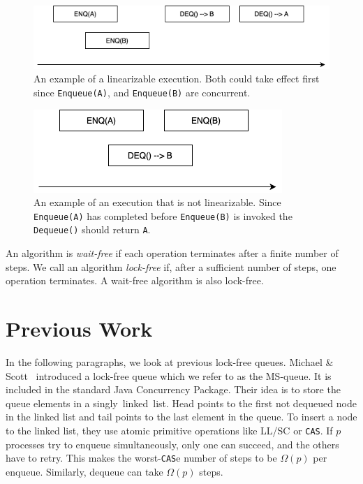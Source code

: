 \documentclass[12pt]{article}
\begin{document}
\begin{figure}[hbt]
  \center\includegraphics[scale=0.5]{pics/good}
  \caption{\label{fig::goodexample}An example of a linearizable execution. Both could take effect first since \texttt{Enqueue(A)}, and \texttt{Enqueue(B)} are concurrent.}
\end{figure}

\begin{figure}[hbt]
  \center\includegraphics[scale=0.5]{pics/bad}
  \caption{\label{fig::badexample}An example of an execution that is not linearizable. Since \texttt{Enqueue(A)} has completed before \texttt{Enqueue(B)} is invoked the \texttt{Dequeue()} should return \texttt{A}.}
\end{figure}


An algorithm is \textit{wait-free} if each operation terminates after a finite number of steps. We call an algorithm \textit{lock-free} if, after a sufficient number of steps, one operation terminates. A wait-free algorithm is also lock-free.


\section{Previous Work}

In the following paragraphs, we look at previous lock-free queues.
Michael \& Scott~\cite{DBLP:conf/podc/MichaelS96} introduced a lock-free queue which we refer to as the MS-queue. It is included in the standard Java Concurrency Package. Their idea is to store the queue elements in a singly~linked~list. Head points to the first not dequeued node in the linked list and tail points to the last element in the queue. To insert a node to the linked list, they use atomic primitive operations like LL/SC or \texttt{CAS}. If $p$ processes try to enqueue simultaneously, only one can succeed, and the others have to retry. This makes the worst-\texttt{CAS}e number of steps to be $\Omega(p)$ per enqueue. Similarly, dequeue can take $\Omega(p)$ steps.
\end{document}
